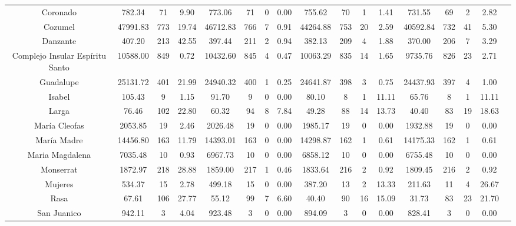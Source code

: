 \documentclass{article} %
\begin{document}
\begin{table}
\begin{adjustwidth}{-2.6cm}{}
\begin{footnotesize}
\begin{tabular}{ccccccccccccccccc}
Coronado &    782.34 &   71 &   9.90 &    773.06 &   71 &    0 &   0.00 &    755.62 &   70 &    1 &   1.41 &    731.55 &   69 &      2 &    2.82 \\
Cozumel &  47991.83 &  773 &  19.74 &  46712.83 &  766 &    7 &   0.91 &  44264.88 &  753 &   20 &   2.59 &  40592.84 &  732 &     41 &    5.30 \\
Danzante &    407.20 &  213 &  42.55 &    397.44 &  211 &    2 &   0.94 &    382.13 &  209 &    4 &   1.88 &    370.00 &  206 &      7 &    3.29 \\
Complejo Insular Espíritu Santo &  10588.00 &  849 &   0.72 &  10432.60 &  845 &    4 &   0.47 &  10063.29 &  835 &   14 &   1.65 &   9735.76 &  826 &     23 &    2.71 \\
Guadalupe &  25131.72 &  401 &  21.99 &  24940.32 &  400 &    1 &   0.25 &  24641.87 &  398 &    3 &   0.75 &  24437.93 &  397 &      4 &    1.00 \\
Isabel &    105.43 &    9 &   1.15 &     91.70 &    9 &    0 &   0.00 &     80.10 &    8 &    1 &  11.11 &     65.76 &    8 &      1 &   11.11 \\
Larga &     76.46 &  102 &  22.80 &     60.32 &   94 &    8 &   7.84 &     49.28 &   88 &   14 &  13.73 &     40.40 &   83 &     19 &   18.63 \\
María Cleofas &   2053.85 &   19 &   2.46 &   2026.48 &   19 &    0 &   0.00 &   1985.17 &   19 &    0 &   0.00 &   1932.88 &   19 &      0 &    0.00 \\
María Madre &  14456.80 &  163 &  11.79 &  14393.01 &  163 &    0 &   0.00 &  14298.87 &  162 &    1 &   0.61 &  14175.33 &  162 &      1 &    0.61 \\
Maria Magdalena &   7035.48 &   10 &   0.93 &   6967.73 &   10 &    0 &   0.00 &   6858.12 &   10 &    0 &   0.00 &   6755.48 &   10 &      0 &    0.00 \\
Monserrat &   1872.97 &  218 &  28.88 &   1859.00 &  217 &    1 &   0.46 &   1833.64 &  216 &    2 &   0.92 &   1809.45 &  216 &      2 &    0.92 \\
Mujeres &    534.37 &   15 &   2.78 &    499.18 &   15 &    0 &   0.00 &    387.20 &   13 &    2 &  13.33 &    211.63 &   11 &      4 &   26.67 \\
Rasa &     67.61 &  106 &  27.77 &     55.12 &   99 &    7 &   6.60 &     40.40 &   90 &   16 &  15.09 &     31.73 &   83 &     23 &   21.70 \\
San Juanico &    942.11 &    3 &   4.04 &    923.48 &    3 &    0 &   0.00 &    894.09 &    3 &    0 &   0.00 &    828.41 &    3 &      0 &    0.00 \\

\end{tabular}
\end{footnotesize}
\end{adjustwidth}
\end{table}
\end{document}
